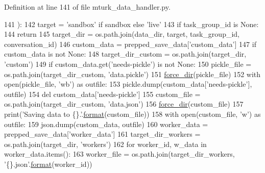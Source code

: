 Definition at line 141 of file mturk\+\_\+data\+\_\+handler.\+py.


\begin{DoxyCode}
141     ):
142         target = \textcolor{stringliteral}{'sandbox'} \textcolor{keywordflow}{if} sandbox \textcolor{keywordflow}{else} \textcolor{stringliteral}{'live'}
143         \textcolor{keywordflow}{if} task\_group\_id \textcolor{keywordflow}{is} \textcolor{keywordtype}{None}:
144             \textcolor{keywordflow}{return}
145         target\_dir = os.path.join(data\_dir, target, task\_group\_id, conversation\_id)
146         custom\_data = prepped\_save\_data[\textcolor{stringliteral}{'custom\_data'}]
147         \textcolor{keywordflow}{if} custom\_data \textcolor{keywordflow}{is} \textcolor{keywordflow}{not} \textcolor{keywordtype}{None}:
148             target\_dir\_custom = os.path.join(target\_dir, \textcolor{stringliteral}{'custom'})
149             \textcolor{keywordflow}{if} custom\_data.get(\textcolor{stringliteral}{'needs-pickle'}) \textcolor{keywordflow}{is} \textcolor{keywordflow}{not} \textcolor{keywordtype}{None}:
150                 pickle\_file = os.path.join(target\_dir\_custom, \textcolor{stringliteral}{'data.pickle'})
151                 \hyperlink{namespaceparlai_1_1mturk_1_1core_1_1mturk__data__handler_a28ec50366a486cded72d95c9be461c2f}{force\_dir}(pickle\_file)
152                 with open(pickle\_file, \textcolor{stringliteral}{'wb'}) \textcolor{keyword}{as} outfile:
153                     pickle.dump(custom\_data[\textcolor{stringliteral}{'needs-pickle'}], outfile)
154                 del custom\_data[\textcolor{stringliteral}{'needs-pickle'}]
155             custom\_file = os.path.join(target\_dir\_custom, \textcolor{stringliteral}{'data.json'})
156             \hyperlink{namespaceparlai_1_1mturk_1_1core_1_1mturk__data__handler_a28ec50366a486cded72d95c9be461c2f}{force\_dir}(custom\_file)
157             print(\textcolor{stringliteral}{'Saving data to \{\}.'}.\hyperlink{namespaceparlai_1_1chat__service_1_1services_1_1messenger_1_1shared__utils_a32e2e2022b824fbaf80c747160b52a76}{format}(custom\_file))
158             with open(custom\_file, \textcolor{stringliteral}{'w'}) \textcolor{keyword}{as} outfile:
159                 json.dump(custom\_data, outfile)
160         worker\_data = prepped\_save\_data[\textcolor{stringliteral}{'worker\_data'}]
161         target\_dir\_workers = os.path.join(target\_dir, \textcolor{stringliteral}{'workers'})
162         \textcolor{keywordflow}{for} worker\_id, w\_data \textcolor{keywordflow}{in} worker\_data.items():
163             worker\_file = os.path.join(target\_dir\_workers, \textcolor{stringliteral}{'\{\}.json'}.\hyperlink{namespaceparlai_1_1chat__service_1_1services_1_1messenger_1_1shared__utils_a32e2e2022b824fbaf80c747160b52a76}{format}(worker\_id))

\end{DoxyCode}
